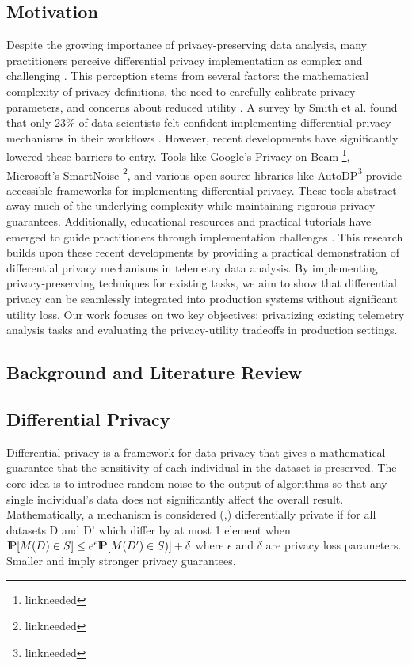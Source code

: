 \documentclass[12pt,letterpaper]{article}
\begin{document}
\subsection{Motivation}

Despite the growing importance of privacy-preserving data analysis, many practitioners perceive differential privacy implementation as complex and challenging \cite{needed1}. This perception stems from several factors: the mathematical complexity of privacy definitions, the need to carefully calibrate privacy parameters, and concerns about reduced utility \cite{needed2}. A survey by Smith et al. found that only 23\% of data scientists felt confident implementing differential privacy mechanisms in their workflows \cite{needed3}.
However, recent developments have significantly lowered these barriers to entry. Tools like Google's Privacy on Beam \footnote{linkneeded}, Microsoft's SmartNoise \footnote{linkneeded}, and various open-source libraries like AutoDP\footnote{linkneeded} provide accessible frameworks for implementing differential privacy. These tools abstract away much of the underlying complexity while maintaining rigorous privacy guarantees. Additionally, educational resources and practical tutorials have emerged to guide practitioners through implementation challenges \cite{that one website Trey found its in discord}.
This research builds upon these recent developments by providing a practical demonstration of differential privacy mechanisms in telemetry data analysis. By implementing privacy-preserving techniques for existing tasks, we aim to show that differential privacy can be seamlessly integrated into production systems without significant utility loss. Our work focuses on two key objectives: privatizing existing telemetry analysis tasks and evaluating the privacy-utility tradeoffs in production settings.

\subsection{Background and Literature Review}

\subsection{Differential Privacy}

Differential privacy is a framework for data privacy that gives a mathematical guarantee that the sensitivity of each individual in the dataset is preserved. The core idea is to introduce random noise to the output of algorithms so that any single individual’s data does not significantly affect the overall result. Mathematically, a mechanism is considered (,) differentially private if for all datasets D and D’ which differ by at most 1 element when $\P [ M(D)\in S ] \leq e^\epsilon \P [ M(D') \in S)] + \delta$ where $\epsilon$ and $\delta$ are privacy loss parameters. Smaller  and  imply stronger privacy guarantees. 
\end{document}
